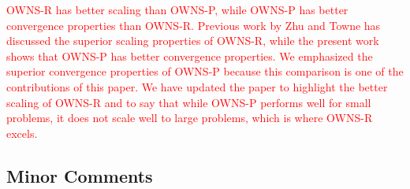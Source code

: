 \documentclass{article}
\newcommand{\response}[1]{\textcolor{red}{#1}}
\begin{document}
\begin{enumerate}
    \response{OWNS-R has better scaling than OWNS-P, while OWNS-P has better convergence properties than OWNS-R. Previous work by Zhu and Towne has discussed the superior scaling properties of OWNS-R, while the present work shows that OWNS-P has better convergence properties. We emphasized the superior convergence properties of OWNS-P because this comparison is one of the contributions of this paper. We have updated the paper to highlight the better scaling of OWNS-R and to say that while OWNS-P performs well for small problems, it does not scale well to large problems, which is where OWNS-R excels.}
    
\end{enumerate}


\subsection*{Minor Comments}
\end{document}
